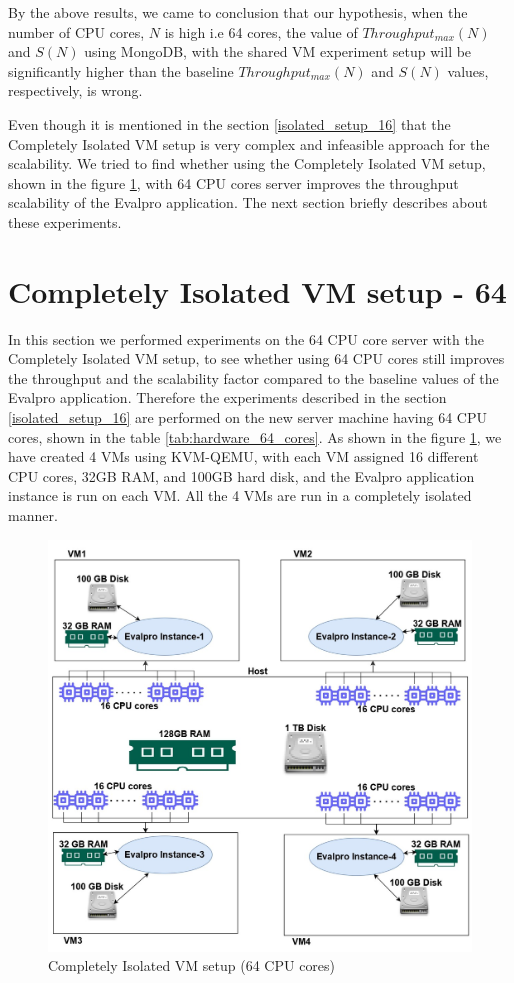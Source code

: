 \documentclass{iitbreport}
\begin{document}
By the above results, we came to conclusion that our hypothesis, when the number of CPU cores, $N$ is high i.e 64 cores, the value of  $Throughput_{max}(N)$ and $S(N)$ using MongoDB, with the shared VM experiment setup will be significantly higher than the baseline  $Throughput_{max}(N)$ and $S(N)$ values, respectively, is wrong.

Even though it is mentioned in the section \ref{isolated_setup_16} that the Completely Isolated VM setup is very complex and infeasible approach for the scalability. We tried to find whether using the Completely Isolated VM setup, shown in the figure \ref{isolated_vm_64_cores}, with 64 CPU cores server improves the throughput scalability of the Evalpro application. The next section briefly describes about these experiments.


\section{Completely Isolated VM setup - 64}\label{isolated_64_cores}

In this section we performed experiments on the 64 CPU core server with the Completely Isolated VM setup, to see whether using 64 CPU cores still improves the  throughput and the scalability factor compared to the baseline values of the Evalpro application. Therefore the experiments described in the section \ref{isolated_setup_16} are performed on the new server machine having 64 CPU cores, shown in the table \ref{tab:hardware_64_cores}. As shown in the figure \ref{isolated_vm_64_cores},  we have created 4 VMs using KVM-QEMU, with each VM assigned 16 different CPU cores, 32GB RAM, and 100GB hard disk, and the Evalpro application instance is run on each VM. All the 4 VMs are run in a completely isolated manner.


\begin{figure}[!htb]
  \centering
  \includegraphics[width=\linewidth]{Images/isolated-vm-64.jpg}
  \caption{Completely Isolated VM setup (64 CPU cores)}
  \label{isolated_vm_64_cores}
\end{figure}
\end{document}
